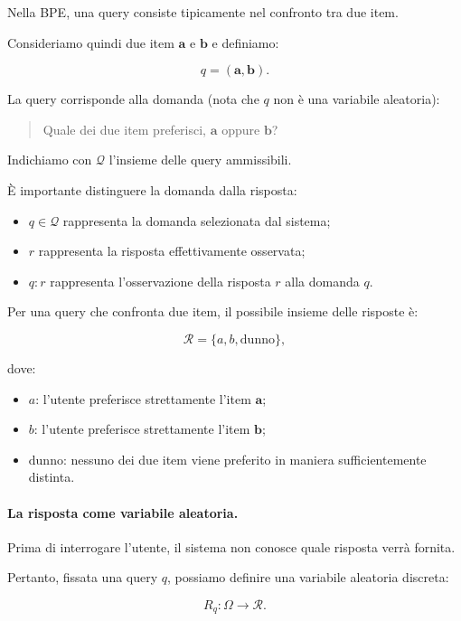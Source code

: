 Nella BPE, una query consiste tipicamente nel confronto tra due item.

Consideriamo quindi due item $\mathbf{a}$ e $\mathbf{b}$ e definiamo:

\[
q=(\mathbf{a},\mathbf{b}).
\]

La query corrisponde alla domanda (nota che $q$ non è una variabile aleatoria):

\begin{quote}
Quale dei due item preferisci, $\mathbf{a}$ oppure $\mathbf{b}$?
\end{quote}

Indichiamo con $\mathcal{Q}$ l'insieme delle query ammissibili.

È importante distinguere la domanda dalla risposta:

\begin{itemize}
    \item $q\in\mathcal{Q}$ rappresenta la domanda selezionata dal sistema;
    \item $r$ rappresenta la risposta effettivamente osservata;
    \item $q:r$ rappresenta l'osservazione della risposta $r$ alla domanda $q$.
\end{itemize}

Per una query che confronta due item, il possibile insieme delle risposte è:

\[
\mathcal{R}=\{a,b,\text{dunno}\},
\]

dove:

\begin{itemize}
    \item $a$: l'utente preferisce strettamente l'item $\mathbf{a}$;
    \item $b$: l'utente preferisce strettamente l'item $\mathbf{b}$;
    \item $\text{dunno}$: nessuno dei due item viene preferito in maniera sufficientemente distinta.
\end{itemize}

\paragraph{La risposta come variabile aleatoria.}

Prima di interrogare l'utente, il sistema non conosce quale risposta verrà fornita.

Pertanto, fissata una query $q$, possiamo definire una variabile aleatoria discreta:

\[
R_q:\Omega\longrightarrow\mathcal{R}.
\]

